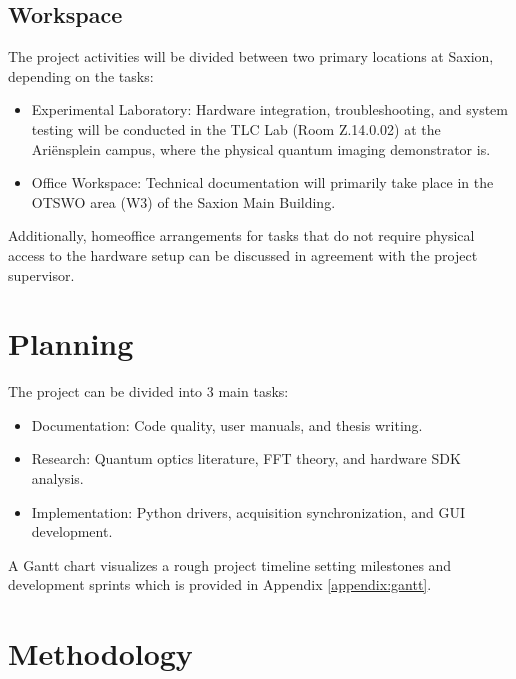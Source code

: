 \documentclass[12pt,a4paper]{article}
\begin{document}
\subsection*{Workspace}
The project activities will be divided between two primary locations at Saxion, depending on the tasks:

\begin{itemize}
    \item Experimental Laboratory: Hardware integration, troubleshooting, and system testing will be conducted in the TLC Lab (Room Z.14.0.02) at the Ariënsplein campus, where the physical quantum imaging demonstrator is.
    \item Office Workspace: Technical documentation will primarily take place in the OTSWO area (W3) of the Saxion Main Building.
\end{itemize}

Additionally, homeoffice arrangements for tasks that do not require physical access to the hardware setup can be discussed in agreement with the project supervisor.

\newpage



\section{Planning}
The project can be divided into 3 main tasks:

\begin{itemize}
    \item Documentation: Code quality, user manuals, and thesis writing.
    \item Research: Quantum optics literature, \ac{FFT} theory, and hardware \ac{SDK} analysis.
    \item Implementation: Python drivers, acquisition synchronization, and \ac{GUI} development.
\end{itemize}

A Gantt chart visualizes a rough project timeline setting milestones and development sprints which is provided in Appendix \ref{appendix:gantt}.

\newpage



\section{Methodology}
\end{document}
